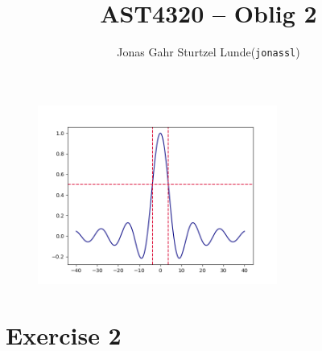 \documentclass[12p,a4paper]{article}
\begin{document}
\title{AST4320 -- Oblig 2}
\author{
    \begin{tabular}{r l}
        Jonas Gahr Sturtzel Lunde & (\texttt{jonassl})
    \end{tabular}}

\maketitle

\hspace{10cm}



\begin{figure}[H]
    \centering
    \includegraphics[width=0.7\textwidth]{tophat.png}
\end{figure}


\newpage
\section*{Exercise 2}
\end{document}
